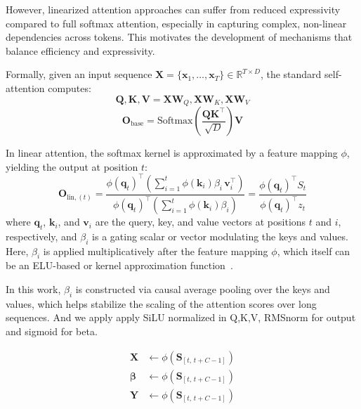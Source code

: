 \documentclass[10pt,a4paper]{article}
\begin{document}
However, linearized attention approaches can suffer from reduced expressivity compared to full softmax attention, especially in capturing complex, non-linear dependencies across tokens. This motivates the development of mechanisms that balance efficiency and expressivity.

Formally, given an input sequence $\mathbf{X} = \{\mathbf{x}_1, \dots, \mathbf{x}_T\} \in \mathbb{R}^{T \times D}$, the standard self-attention computes:
\begin{equation}
\mathbf{Q}, \mathbf{K}, \mathbf{V} = \mathbf{X}\mathbf{W}_Q, \mathbf{X}\mathbf{W}_K, \mathbf{X}\mathbf{W}_V
\end{equation}
\begin{equation}
\mathbf{O}_{\text{base}} = \text{Softmax}\left(\frac{\mathbf{Q}\mathbf{K}^\top}{\sqrt{D}}\right)\mathbf{V}
\end{equation}

In linear attention, the softmax kernel is approximated by a feature mapping $\phi$, yielding the output at position $t$:
\begin{equation}
\mathbf{O}_{\text{lin}, (t)} = 
\frac{
\phi(\mathbf{q}_t)^\top \left( \sum_{i=1}^t \phi(\mathbf{k}_i) \beta_i\, \mathbf{v}_i^\top \right)}{
\phi(\mathbf{q}_t)^\top \left( \sum_{i=1}^t \phi(\mathbf{k}_i) \beta_i \right)} 
= \frac{\phi(\mathbf{q}_t)^\top S_t}{\phi(\mathbf{q}_t)^\top z_t}
\end{equation}
where $\mathbf{q}_t$, $\mathbf{k}_i$, and $\mathbf{v}_i$ are the query, key, and value vectors at positions $t$ and $i$, respectively, and $\beta_i$ is a gating scalar or vector modulating the keys and values. Here, $\beta_i$ is applied multiplicatively after the feature mapping $\phi$, which itself can be an ELU-based or kernel approximation function~\cite{wang2020linformer}. 

In this work, $\beta_i$ is constructed via causal average pooling over the keys and values, which helps stabilize the scaling of the attention scores over long sequences. And we apply apply SiLU normalized in Q,K,V, RMSnorm for output and sigmoid for beta. %

\begin{align}
    \mathbf{X} &\leftarrow \phi(\mathbf{S}_{[t,\,t+C-1]}) \\
    \mathbf{\beta} &\leftarrow \phi(\mathbf{S}_{[t,\,t+C-1]}) \\
    \mathbf{Y} &\leftarrow \phi(\mathbf{S}_{[t,\,t+C-1]})
\end{align}
\end{document}
